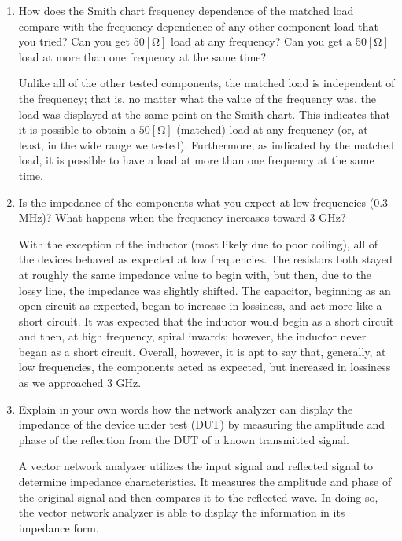 \documentclass[
	letterpaper, %
	10pt, %
]{CSUniSchoolLabReport}
\begin{document}
\begin{enumerate}

  \item How does the Smith chart frequency dependence of the matched load compare with the frequency dependence of any other component load that you tried? Can you get 50$[\si{\ohm}]$ load at any frequency? Can you get a 50$[\si{\ohm}]$ load at more than one frequency at the same time?

    Unlike all of the other tested components, the matched load is independent of the frequency; that is, no matter what the value of the frequency was, the load was displayed at the same point on the Smith chart. This indicates that it is possible to obtain a $50[\si{\ohm}]$ (matched) load at any frequency (or, at least, in the wide range we tested). Furthermore, as indicated by the matched load, it is possible to have a load at more than one frequency at the same time.

  \item Is the impedance of the components what you expect at low frequencies (0.3 MHz)? What happens when the frequency increases toward 3 GHz?

    With the exception of the inductor (most likely due to poor coiling), all of the devices behaved as expected at low frequencies. The resistors both stayed at roughly the same impedance value to begin with, but then, due to the lossy line, the impedance was slightly shifted. The capacitor, beginning as an open circuit as expected, began to increase in lossiness, and act more like a short circuit. It was expected that the inductor would begin as a short circuit and then, at high frequency, spiral inwards; however, the inductor never began as a short circuit. Overall, however, it is apt to say that, generally, at low frequencies, the components acted as expected, but increased in lossiness as we approached 3 GHz.

  \item Explain in your own words how the network analyzer can display the impedance of the device under test (DUT) by measuring the amplitude and phase of the reflection from the DUT of a known transmitted signal.

    A vector network analyzer utilizes the input signal and reflected signal to determine impedance characteristics. It measures the amplitude and phase of the original signal and then compares it to the reflected wave. In doing so, the vector network analyzer is able to display the information in its impedance form.


\end{enumerate}
\end{document}
